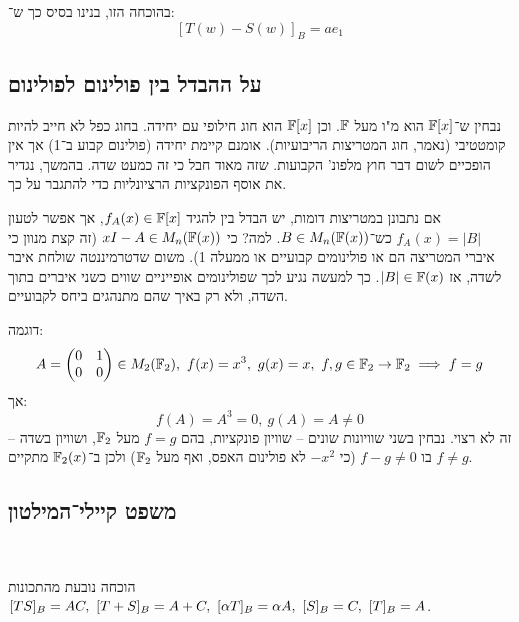 \documentclass[name=רשימות אלגברה לינארית 2א]{../../../tex/classes/megasumPreamble}
\begin{document}
	בהוכחה הזו, בנינו בסיס כך ש־: 
	\[ [T(w) - S(w)]_B = ae_1 \]
	
	
	\npage
	\subsection{על ההבדל בין פולינום לפולינום}
	נבחין ש־$\mathbb{F}[x]$ הוא מ"ו מעל $\mathbb{F}$. וכן $\mathbb{F}[x]$ הוא חוג חילופי עם יחידה. בחוג כפל לא חייב להיות קומטטיבי (נאמר, חוג המטריצות הריבועיות). אומנם קיימת יחידה (פולינום קבוע ב־1) אך אין הופכיים לשום דבר חוץ מלפונ' הקבועות. שזה מאוד חבל כי זה כמעט שדה. בהמשך, נגדיר את אוסף הפונקציות הרציונליות כדי להתגבר על כך. 
	
	אם נתבונן במטריצות דומות, יש הבדל בין להגיד $f_A(x) \in \mathbb{F}[x]$, אך אפשר לטעון $f_A(x) = |B|$ כש־$B \in M_n(\mathbb{F}(x))$. למה? כי $xI - A \in M_n(\mathbb{F}(x))$ (זה קצת מנוון כי איברי המטריצה הם או פולינומים קבועיים או ממעלה 1). משום שדטרמיננטה שולחת איבר לשדה, אז $|B| \in \mathbb{F}(x)$. כך למעשה נגיע לכך שפולינומים אופייניים שווים כשני איברים בתוך השדה, ולא רק באיך שהם מתנהגים ביחס לקבועיים. 
	
	דוגמה: 
	\[ A = \begin{pmatrix} 0 & 1 \\ 0 & 0 \end{pmatrix} \in M_2(\mathbb{F}_2), \ f(x) = x^3, \ g(x) = x, \ f, g \in \mathbb{F}_2 \to \mathbb{F}_2 \implies f = g \]
	אך: 
	\[ f(A) = A^3 = 0, \ g(A) = A \neq 0 \]
	זה לא רצוי. נבחין בשני שוויונות שונים – שוויון פונקציות, בהם $f = g$ מעל $\mathbb{F}_2$, ושוויון בשדה – בו $f -g \neq 0$ (כי $-x^2$ לא פולינום האפס, ואף מעל $\mathbb{F}_2$) ולכן ב־$\mathbb{F}_2(x)$ מתקיים $f \neq g$. 
	
	\subsection{משפט קיילי־המילטון}\ 
	

	
	הוכחה נובעת מהתכונות $[TS]_B = AC, \ [T + S]_B = A + C, \ [\alpha T]_B = \alpha A, \ [S]_B = C, \ [T]_B = A$. 
	
\end{document}
